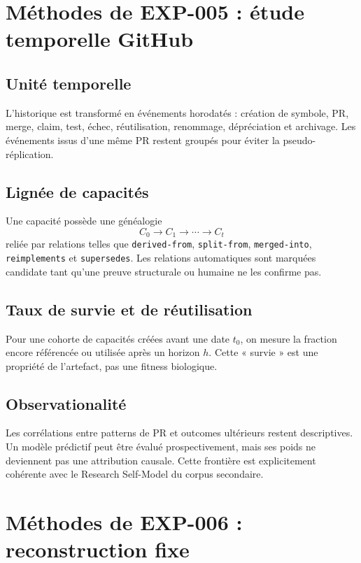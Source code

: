 \chapter{Méthodes de EXP-005 : étude temporelle GitHub}

\section{Unité temporelle}

L'historique est transformé en événements horodatés : création de symbole, PR, merge, claim, test, échec, réutilisation, renommage, dépréciation et archivage. Les événements issus d'une même PR restent groupés pour éviter la pseudo-réplication.

\section{Lignée de capacités}

Une capacité possède une généalogie
\[
C_0\to C_1\to\cdots\to C_t
\]
reliée par relations telles que \texttt{derived-from}, \texttt{split-from}, \texttt{merged-into}, \texttt{reimplements} et \texttt{supersedes}. Les relations automatiques sont marquées candidate tant qu'une preuve structurale ou humaine ne les confirme pas.

\section{Taux de survie et de réutilisation}

Pour une cohorte de capacités créées avant une date $t_0$, on mesure la fraction encore référencée ou utilisée après un horizon $h$. Cette « survie » est une propriété de l'artefact, pas une fitness biologique.

\section{Observationalité}

Les corrélations entre patterns de PR et outcomes ultérieurs restent descriptives. Un modèle prédictif peut être évalué prospectivement, mais ses poids ne deviennent pas une attribution causale. Cette frontière est explicitement cohérente avec le Research Self-Model du corpus secondaire.

\chapter{Méthodes de EXP-006 : reconstruction fixe}

